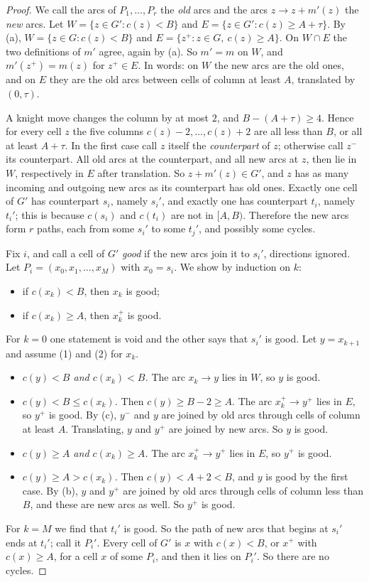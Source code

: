\documentclass[11pt]{amsart}
\theoremstyle{remark}
\begin{document}
\begin{proof}
We call the arcs of $P_1,\dots,P_r$ the \emph{old} arcs and the arcs $z\to z+m'(z)$ the \emph{new} arcs.
Let $W=\{z\in G':c(z)<B\}$ and $E=\{z\in G':c(z)\ge A+\tau\}$. By (a), $W=\{z\in G:c(z)<B\}$ and
$E=\{z^+:z\in G,\ c(z)\ge A\}$. On $W\cap E$ the two definitions of $m'$ agree, again by (a). So $m'=m$ on $W$, and
$m'(z^+)=m(z)$ for $z^+\in E$. In words: on $W$ the new arcs are the old ones, and on $E$ they are the old arcs
between cells of column at least $A$, translated by $(0,\tau)$.

A knight move changes the column by at most $2$, and $B-(A+\tau)\ge4$. Hence for every cell $z$ the five columns
$c(z)-2,\dots,c(z)+2$ are all less than $B$, or all at least $A+\tau$. In the first case call $z$ itself the
\emph{counterpart} of $z$; otherwise call $z^-$ its counterpart. All old arcs at the counterpart, and all new arcs at
$z$, then lie in $W$, respectively in $E$ after translation. So $z+m'(z)\in G'$, and $z$ has as many incoming and
outgoing new arcs as its counterpart has old ones. Exactly one cell of $G'$ has counterpart $s_i$, namely $s_i'$,
and exactly one has counterpart $t_i$, namely $t_i'$; this is because $c(s_i)$ and $c(t_i)$ are not in $[A,B)$.
Therefore the new arcs form $r$ paths, each from some $s_i'$ to some $t_j'$, and possibly some cycles.

Fix $i$, and call a cell of $G'$ \emph{good} if the new arcs join it to $s_i'$, directions ignored. Let
$P_i=(x_0,x_1,\dots,x_M)$ with $x_0=s_i$. We show by induction on $k$:
\begin{itemize}
\item[(1)] if $c(x_k)<B$, then $x_k$ is good;
\item[(2)] if $c(x_k)\ge A$, then $x_k^+$ is good.
\end{itemize}
For $k=0$ one statement is void and the other says that $s_i'$ is good. Let $y=x_{k+1}$ and assume (1) and (2) for
$x_k$.
\begin{itemize}
\item \emph{$c(y)<B$ and $c(x_k)<B$.} The arc $x_k\to y$ lies in $W$, so $y$ is good.
\item \emph{$c(y)<B\le c(x_k)$.} Then $c(y)\ge B-2\ge A$. The arc $x_k^+\to y^+$ lies in $E$, so $y^+$ is good. By
(c), $y^-$ and $y$ are joined by old arcs through cells of column at least $A$. Translating, $y$ and $y^+$ are
joined by new arcs. So $y$ is good.
\item \emph{$c(y)\ge A$ and $c(x_k)\ge A$.} The arc $x_k^+\to y^+$ lies in $E$, so $y^+$ is good.
\item \emph{$c(y)\ge A>c(x_k)$.} Then $c(y)<A+2<B$, and $y$ is good by the first case. By (b), $y$ and $y^+$ are
joined by old arcs through cells of column less than $B$, and these are new arcs as well. So $y^+$ is good.
\end{itemize}
For $k=M$ we find that $t_i'$ is good. So the path of new arcs that begins at $s_i'$ ends at $t_i'$; call it
$P_i'$. Every cell of $G'$ is $x$ with $c(x)<B$, or $x^+$ with $c(x)\ge A$, for a cell $x$ of some $P_i$, and then
it lies on $P_i'$. So there are no cycles.


\end{proof}
\end{document}
